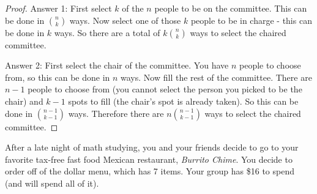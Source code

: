 \begin{questions}
\begin{parts}
\begin{solution}
\begin{proof}
      Answer 1: First select $k$ of the $n$ people to be on the committee.  This can be done in ${n \choose k}$ ways.  Now select one of those $k$ people to be in charge - this can be done in $k$ ways.  So there are a total of $k {n \choose k}$ ways to select the chaired committee.
      
      Answer 2: First select the chair of the committee.  You have $n$ people to choose from, so this can be done in $n$ ways.  Now fill the rest of the committee.  There are $n-1$ people to choose from (you cannot select the person you picked to be the chair) and $k-1$ spots to fill (the chair's spot is already taken).  So this can be done in ${n-1 \choose k-1}$ ways.  Therefore there are $n{n-1 \choose k-1}$ ways to select the chaired committee.
    \end{proof}

  \end{solution}

\end{parts}



\question[6] After a late night of math studying, you and your friends decide to go to your favorite tax-free fast food Mexican restaurant, {\em Burrito Chime}.  You decide to order off of the dollar menu, which has 7 items.  Your group has \$16 to spend (and will spend all of it). 
\end{questions}
